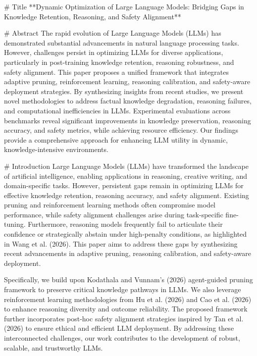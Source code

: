 # Title  
**Dynamic Optimization of Large Language Models: Bridging Gaps in Knowledge Retention, Reasoning, and Safety Alignment**

# Abstract  
The rapid evolution of Large Language Models (LLMs) has demonstrated substantial advancements in natural language processing tasks. However, challenges persist in optimizing LLMs for diverse applications, particularly in post-training knowledge retention, reasoning robustness, and safety alignment. This paper proposes a unified framework that integrates adaptive pruning, reinforcement learning, reasoning calibration, and safety-aware deployment strategies. By synthesizing insights from recent studies, we present novel methodologies to address factual knowledge degradation, reasoning failures, and computational inefficiencies in LLMs. Experimental evaluations across benchmarks reveal significant improvements in knowledge preservation, reasoning accuracy, and safety metrics, while achieving resource efficiency. Our findings provide a comprehensive approach for enhancing LLM utility in dynamic, knowledge-intensive environments.

# Introduction  
Large Language Models (LLMs) have transformed the landscape of artificial intelligence, enabling applications in reasoning, creative writing, and domain-specific tasks. However, persistent gaps remain in optimizing LLMs for effective knowledge retention, reasoning accuracy, and safety alignment. Existing pruning and reinforcement learning methods often compromise model performance, while safety alignment challenges arise during task-specific fine-tuning. Furthermore, reasoning models frequently fail to articulate their confidence or strategically abstain under high-penalty conditions, as highlighted in Wang et al. (2026). This paper aims to address these gaps by synthesizing recent advancements in adaptive pruning, reasoning calibration, and safety-aware deployment.

Specifically, we build upon Kodathala and Vunnam's (2026) agent-guided pruning framework to preserve critical knowledge pathways in LLMs. We also leverage reinforcement learning methodologies from Hu et al. (2026) and Cao et al. (2026) to enhance reasoning diversity and outcome reliability. The proposed framework further incorporates post-hoc safety alignment strategies inspired by Tan et al. (2026) to ensure ethical and efficient LLM deployment. By addressing these interconnected challenges, our work contributes to the development of robust, scalable, and trustworthy LLMs.

